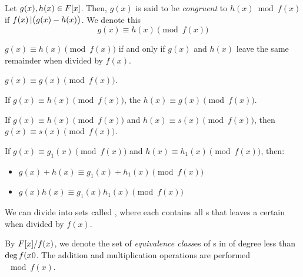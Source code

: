 \begin{definition}[Congruent]\label{def:Polynomial_Ring_Properties-Congruent}
  Let $g(x), h(x) \in F[x]$.
  Then, $g(x)$ is said to be \emph{congruent} to $h(x) \bmod f(x)$ if $f(x) \operatorname{\vert} \bigl( g(x) - h(x) \bigr)$.
  We denote this
  \begin{equation}\label{eq:Polynomial_Ring_Properties-Congruent}
    g(x) \equiv h(x) \pmod{f(x)}
  \end{equation}
\end{definition}

\begin{propertylist}
\item $g(x) \equiv h(x) \pmod{f(x)}$ if and only if $g(x)$ and $h(x)$ leave the same remainder when divided by $f(x)$.\label{prop:Polynomial_Ring_Properties-Equivalence}
\item $g(x) \equiv g(x) \pmod{f(x)}$.\label{prop:Polynomial_Ring_Properties-Reflexivity}
\item If $g(x) \equiv h(x) \pmod{f(x)}$, the $h(x) \equiv g(x) \pmod{f(x)}$.\label{prop:Polynomial_Ring_Properties-Symmetry}
\item If $g(x) \equiv h(x) \pmod{f(x)}$ and $h(x) \equiv s(x) \pmod{f(x)}$, then $g(x) \equiv s(x) \pmod{f(x)}$.\label{prop:Polynomial_Ring_Properties-Transitivity}
\item If $g(x) \equiv g_{1}(x) \pmod{f(x)}$ and $h(x) \equiv h_{1}(x) \pmod{f(x)}$, then:\label{prop:Polynomial_Ring_Properties-Linearity}
\begin{itemize}[noitemsep]
\item $g(x) + h(x) \equiv g_{1}(x) + h_{1}(x) \pmod{f(x)}$
\item $g(x) h(x) \equiv g_{1}(x) h_{1}(x) \pmod{f(x)}$
\end{itemize}
\end{propertylist}

We can divide  into sets called , where each  contains all s that leaves a certain  when divided by $f(x)$.

\begin{definition}\label{def:Polynomial_Ring_Properties-Equivalence_Classes}
  By $F[x] / f(x)$, we denote the set of \emph{equivalence class}es of s in  of degree less than $\operatorname{\text{deg}} f(x0$.
  The addition and multiplication operations are performed $\mod f(x)$.
\end{definition}

